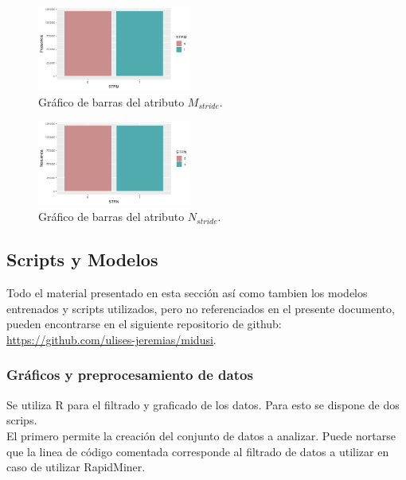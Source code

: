 \documentclass[osajnl,twocolumn,showpacs,superscriptaddress,10pt]{revtex4-1} %
\begin{document}
\begin{figure}[H]
    \centering
    \includegraphics[width=0.45\textwidth]{plots/strm_bar}
    \caption{Gráfico de barras del atributo $M_{stride}$.}
    \label{figure:strm_bar}
\end{figure}

\begin{figure}[H]
    \centering
    \includegraphics[width=0.45\textwidth]{plots/strn_bar}
    \caption{Gráfico de barras del atributo $N_{stride}$.}
    \label{figure:strn_bar}
\end{figure}

\onecolumngrid

\subsection{Scripts y Modelos} \label{apendix:scripts}

Todo el material presentado en esta sección así como tambien los modelos entrenados y scripts utilizados, pero no referenciados en el presente documento, pueden encontrarse en el siguiente repositorio de github: \url{https://github.com/ulises-jeremias/midusi}.

\subsubsection{Gráficos y preprocesamiento de datos}

Se utiliza R para el filtrado y graficado de los datos. Para esto se dispone de dos scrips. \\

El primero permite la creación del conjunto de datos a analizar. Puede nortarse que la linea de código comentada corresponde al filtrado de datos a utilizar en caso de utilizar RapidMiner. \\
\end{document}
